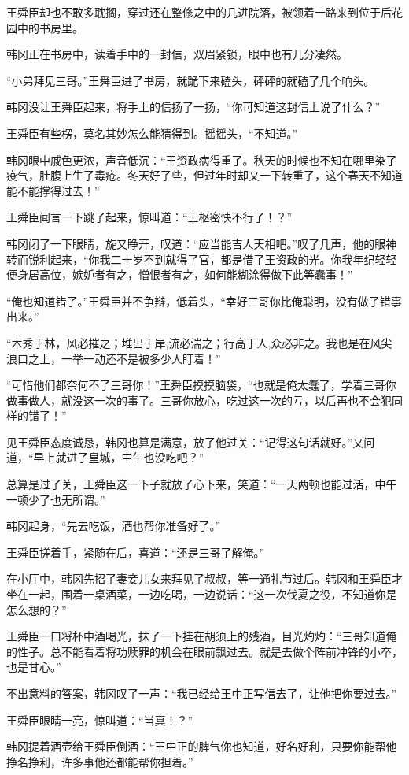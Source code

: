 王舜臣却也不敢多耽搁，穿过还在整修之中的几进院落，被领着一路来到位于后花园中的书房里。

韩冈正在书房中，读着手中的一封信，双眉紧锁，眼中也有几分凄然。

“小弟拜见三哥。”王舜臣进了书房，就跪下来磕头，砰砰的就磕了几个响头。

韩冈没让王舜臣起来，将手上的信扬了一扬，“你可知道这封信上说了什么？”

王舜臣有些楞，莫名其妙怎么能猜得到。摇摇头，“不知道。”

韩冈眼中戚色更浓，声音低沉：“王资政病得重了。秋天的时候也不知在哪里染了疫气，肚腹上生了毒疮。冬天好了些，但过年时却又一下转重了，这个春天不知道能不能撑得过去！”

王舜臣闻言一下跳了起来，惊叫道：“王枢密快不行了！？”

韩冈闭了一下眼睛，旋又睁开，叹道：“应当能吉人天相吧。”叹了几声，他的眼神转而锐利起来，“你我二十岁不到就得了官，都是借了王资政的光。你我年纪轻轻便身居高位，嫉妒者有之，憎恨者有之，如何能糊涂得做下此等蠢事！”

“俺也知道错了。”王舜臣并不争辩，低着头，“幸好三哥你比俺聪明，没有做了错事出来。”

“木秀于林，风必摧之；堆出于岸,流必湍之；行高于人,众必非之。我也是在风尖浪口之上，一举一动还不是被多少人盯着！”

“可惜他们都奈何不了三哥你！”王舜臣摸摸脑袋，“也就是俺太蠢了，学着三哥你做事做人，就没这一次的事了。三哥你放心，吃过这一次的亏，以后再也不会犯同样的错了！”

见王舜臣态度诚恳，韩冈也算是满意，放了他过关：“记得这句话就好。”又问道，“早上就进了皇城，中午也没吃吧？”

总算是过了关，王舜臣这一下子就放了心下来，笑道：“一天两顿也能过活，中午一顿少了也无所谓。”

韩冈起身，“先去吃饭，酒也帮你准备好了。”

王舜臣搓着手，紧随在后，喜道：“还是三哥了解俺。”

在小厅中，韩冈先招了妻妾儿女来拜见了叔叔，等一通礼节过后。韩冈和王舜臣才坐在一起，围着一桌酒菜，一边吃喝，一边说话：“这一次伐夏之役，不知道你是怎么想的？”

王舜臣一口将杯中酒喝光，抹了一下挂在胡须上的残酒，目光灼灼：“三哥知道俺的性子。总不能看着将功赎罪的机会在眼前飘过去。就是去做个阵前冲锋的小卒，也是甘心。”

不出意料的答案，韩冈叹了一声：“我已经给王中正写信去了，让他把你要过去。”

王舜臣眼睛一亮，惊叫道：“当真！？”

韩冈提着酒壶给王舜臣倒酒：“王中正的脾气你也知道，好名好利，只要你能帮他挣名挣利，许多事他还都能帮你担着。”

